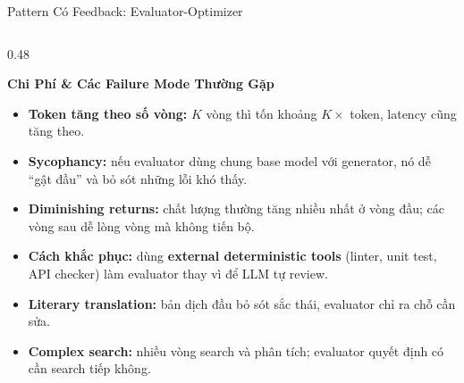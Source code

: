 \documentclass[aspectratio=1610,10pt,xcolor={table}]{beamer}
\begin{document}
\begin{frame}{Pattern Có Feedback: Evaluator-Optimizer}
\begin{columns}[t]
    \begin{column}{0.48\textwidth}
      \begin{alertblock}{\textbf{Chi Phí \& Các Failure Mode Thường Gặp}}
        \footnotesize
        \begin{itemize}
          \item \textbf{Token tăng theo số vòng:} $K$ vòng thì tốn khoảng $K\times$ token, latency cũng tăng theo.
          \item \textbf{Sycophancy:} nếu evaluator dùng chung base model với generator, nó dễ ``gật đầu'' và bỏ sót những lỗi khó thấy.
          \item \textbf{Diminishing returns:} chất lượng thường tăng nhiều nhất ở vòng đầu; các vòng sau dễ lòng vòng mà không tiến bộ.
          \item \textbf{Cách khắc phục:} dùng \textbf{external deterministic tools} (linter, unit test, API checker) làm evaluator thay vì để LLM tự review.
        \end{itemize}
      \end{alertblock}
      \begin{tcolorbox}[usecase,title={Use case}]
        \scriptsize
        \begin{itemize}\scriptsize
          \item \textbf{Literary translation:} bản dịch đầu bỏ sót sắc thái, evaluator chỉ ra chỗ cần sửa.
          \item \textbf{Complex search:} nhiều vòng search và phân tích; evaluator quyết định có cần search tiếp không.
        \end{itemize}
      \end{tcolorbox}
    \end{column}
  \end{columns}
\end{frame}
\end{document}
